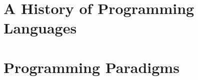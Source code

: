 \toclineskip
\section{A History of Programming Languages}



\toclineskip
\section{Programming Paradigms}



